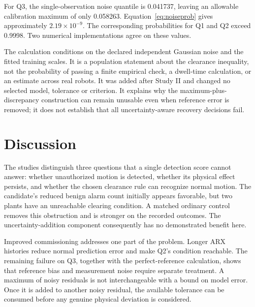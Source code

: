 \documentclass[11pt]{article}
\begin{document}
\begin{table}[htbp]\centering\small
\caption{Conditional perfect-reference diagnostic with $N=5{,}500$, $\delta=0.1$ and $\gamma=0.95$. The final column is the probability that a noise-only calibration maximum leaves enough margin for 95\% population feasibility.}\label{tab:noise}

\end{table}

For Q3, the single-observation noise quantile is 0.041737, leaving an allowable calibration maximum of only 0.058263. Equation~\ref{eq:noiseprob} gives approximately $2.19\times10^{-9}$. The corresponding probabilities for Q1 and Q2 exceed 0.9998. Two numerical implementations agree on these values.

The calculation conditions on the declared independent Gaussian noise and the fitted training scales. It is a population statement about the clearance inequality, not the probability of passing a finite empirical check, a dwell-time calculation, or an estimate across real robots. It was added after Study II and changed no selected model, tolerance or criterion. It explains why the maximum-plus-discrepancy construction can remain unusable even when reference error is removed; it does not establish that all uncertainty-aware recovery decisions fail.



\section{Discussion}
The studies distinguish three questions that a single detection score cannot answer: whether unauthorized motion is detected, whether its physical effect persists, and whether the chosen clearance rule can recognize normal motion. The candidate's reduced benign alarm count initially appears favorable, but two plants have an unreachable clearing condition. A matched ordinary control removes this obstruction and is stronger on the recorded outcomes. The uncertainty-addition component consequently has no demonstrated benefit here.

Improved commissioning addresses one part of the problem. Longer ARX histories reduce normal prediction error and make Q2's condition reachable. The remaining failure on Q3, together with the perfect-reference calculation, shows that reference bias and measurement noise require separate treatment. A maximum of noisy residuals is not interchangeable with a bound on model error. Once it is added to another noisy residual, the available tolerance can be consumed before any genuine physical deviation is considered.
\end{document}
